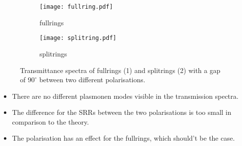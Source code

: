 \begin{figure}[htbp]
\begin{subfigure}{0.48\textwidth}
    \texttt{[image: fullring.pdf]}
    \caption{fullrings  }
    \label{fig:ftir_fr}
\end{subfigure}
\hfill
\begin{subfigure}{0.48\textwidth}
    \texttt{[image: splitring.pdf]}
    \caption{splitrings}
    \label{fig:ftir_sr}
\end{subfigure}
\caption{Transmittance spectra of fullrings (1) and splitrings (2) with a gap of $90^{\circ}$ between two different polarisations. }
\label{fig:ftir}
\end{figure}

\begin{itemize}
\item{There are no different plasmonen modes visible in the transmission spectra.}
\item{The difference for the SRRs between the two polarisations is too small in comparison to the theory. }
\item{The polarisation has an effect for the fullrings, which should't be the case. }
  \end{itemize}
